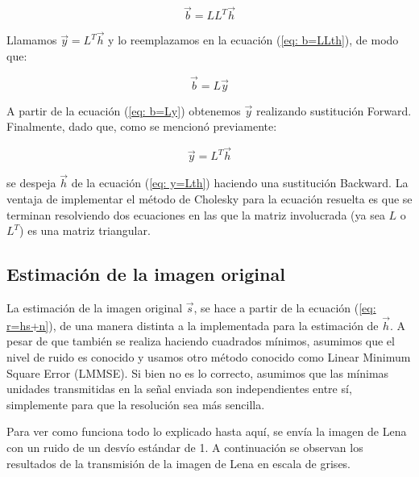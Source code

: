 \begin{equation} 
\vec{b} = L L^T \vec{h} 
\label{eq: b=LLth}
\end{equation} 

Llamamos $\vec{y} = L^T \vec{h}$ y lo reemplazamos en la ecuaci\'on (\ref{eq: b=LLth}), de modo que:

\begin{equation} 
\vec{b} = L \vec{y}
\label{eq: b=Ly}
\end{equation} 

A partir de la ecuaci\'on (\ref{eq: b=Ly}) obtenemos $ \vec{y}$ realizando sustituci\'on Forward. Finalmente, dado que, como se mencion\'o previamente:

 \begin{equation} 
\vec{y} = L^T \vec{h} 
\label{eq: y=Lth}
\end{equation}

se despeja $\vec{h}$ de la ecuaci\'on (\ref{eq: y=Lth}) haciendo una sustituci\'on Backward. La ventaja de implementar el m\'etodo de Cholesky para la ecuaci\'on resuelta es que se terminan resolviendo dos ecuaciones en las que la matriz involucrada (ya sea $L$ o $L^T$) es una matriz triangular.

\subsection{Estimaci\'on de la imagen original}

La estimaci\'on de la imagen original $\vec{s}$, se hace a partir de la ecuaci\'on (\ref{eq: r=hs+n}), de una manera distinta a la implementada para la estimaci\'on de  $\vec{h}$. A pesar de que tambi\'en se realiza haciendo cuadrados m\'inimos, asumimos que el nivel de ruido es conocido y usamos otro m\'etodo  conocido como Linear Minimum Square Error (LMMSE). Si bien no es lo correcto, asumimos que las m\'inimas unidades transmitidas en la se\~nal enviada son independientes entre s\'i, simplemente para que la resoluci\'on sea m\'as sencilla. 


Para ver como funciona todo lo explicado hasta aqu\'i, se env\'ia la imagen de Lena con un ruido de un desv\'io est\'andar de 1. A continuaci\'on se observan los resultados de la transmisi\'on de la imagen de Lena en escala de grises.
 
